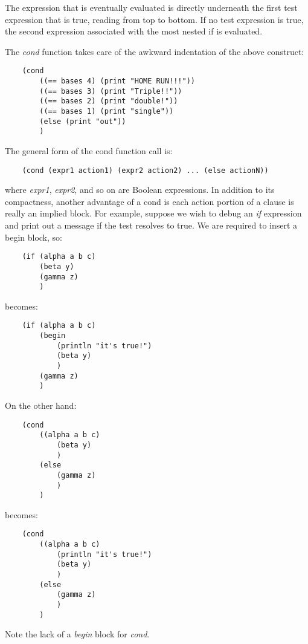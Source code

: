 The expression that is eventually evaluated is
directly underneath the first test expression
that is true, reading from top to bottom.
If no test expression is true, the second expression associated
with the most nested if is evaluated.

The {\it cond} function takes care  of the awkward indentation
of the above construct:

\begin{verbatim}
    (cond
        ((== bases 4) (print "HOME RUN!!!"))
        ((== bases 3) (print "Triple!!"))
        ((== bases 2) (print "double!"))
        ((== bases 1) (print "single"))
        (else (print "out"))
        )
\end{verbatim}

The general form of the cond function call is:

\begin{verbatim}
    (cond (expr1 action1) (expr2 action2) ... (else actionN))
\end{verbatim}

where {\it expr1}, {\it expr2}, and so on are Boolean expressions. In addition
to its compactness, another advantage of a cond is each action
portion of a clause is really an implied block. For example,
suppose we wish to debug an {\it if} expression and print out a
message if the test resolves to true. We are required to insert
a begin block, so:

\begin{verbatim}
    (if (alpha a b c)
        (beta y)
        (gamma z)
        )
\end{verbatim}

becomes:

\begin{verbatim}
    (if (alpha a b c)
        (begin
            (println "it's true!")
            (beta y)
            )
        (gamma z)
        )
\end{verbatim}

On the other hand:

\begin{verbatim}
    (cond
        ((alpha a b c)
            (beta y)
            )
        (else
            (gamma z)
            )
        )
\end{verbatim}

becomes:

\begin{verbatim}
    (cond
        ((alpha a b c)
            (println "it's true!")
            (beta y)
            )
        (else
            (gamma z)
            )
        )
\end{verbatim}

Note the lack of a {\it begin} block for {\it cond}.
